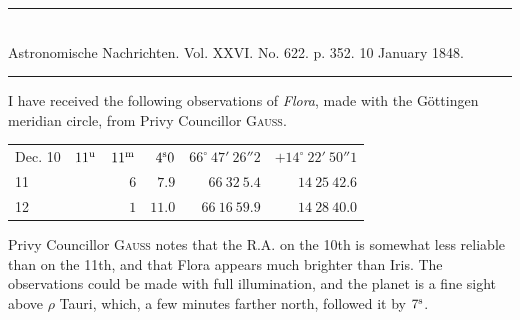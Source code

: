 \clearpage
{}
\begin{center}
\rule{0.55\linewidth}{0.4pt}\\[2pt]
Astronomische Nachrichten. Vol. XXVI. No. 622. p. 352. 10 January 1848.\\[2pt]
\rule{0.55\linewidth}{0.4pt}
\end{center}

I have received the following observations of \emph{Flora}, made with the Göttingen meridian circle, from Privy Councillor \textsc{Gauss}.

\begin{center}
\setlength{\tabcolsep}{4pt}
\begin{tabular}{l|r r r|r|r}
Dec. 10 & $11^{\rm u}$ & $11^{\rm m}$ & $4^{\rm s}0$ & $66^\circ\ 47'\ 26''2$ & $+14^\circ\ 22'\ 50''1$ \\
\hfill 11 & & $6$ & $7.9$ & $66\ 32\ 5.4$ & $14\ 25\ 42.6$ \\
\hfill 12 & & $1$ & $11.0$ & $66\ 16\ 59.9$ & $14\ 28\ 40.0$ \\
\end{tabular}
\end{center}

Privy Councillor \textsc{Gauss} notes that the R.A. on the 10th is somewhat less reliable than on the 11th, and that Flora appears much brighter than Iris. The observations could be made with full illumination, and the planet is a fine sight above $\rho$ Tauri, which, a few minutes farther north, followed it by $7^{\rm s}$.

